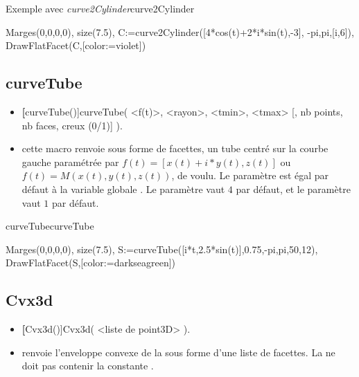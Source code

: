 \begin{demo}{Exemple avec \textsl{curve2Cylinder}}{curve2Cylinder}
\begin{texgraph}[name=curve2Cylinder]
Marges(0,0,0,0), size(7.5),
C:=curve2Cylinder([4*cos(t)+2*i*sin(t),-3],
         -pi,pi,[i,6]),
DrawFlatFacet(C,[color:=violet]) 
\end{texgraph}
\end{demo}


\subsection{curveTube}
\begin{itemize}
 \item \util \textbf[curveTube()]{curveTube( <f(t)>, <rayon>, <tmin>, <tmax> [, nb points, nb faces, creux (0/1)] )}.
 \item \desc cette macro renvoie sous forme de facettes, un tube centré sur la courbe gauche paramétrée par $f(t)=[x(t)+i*y(t), z(t)]$ ou $f(t)=M(x(t),y(t),z(t))$, de  voulu. Le paramètre  est égal par défaut à la variable globale . Le paramètre  vaut $4$ par défaut, et le paramètre  vaut $1$ par défaut.
\end{itemize}


\begin{demo}{curveTube}{curveTube}
\begin{texgraph}[name=curveTube]
Marges(0,0,0,0), size(7.5),
S:=curveTube([i*t,2.5*sin(t)],0.75,-pi,pi,50,12),
DrawFlatFacet(S,[color:=darkseagreen])
\end{texgraph}
\end{demo}

\subsection{Cvx3d}
\begin{itemize}
 \item \util \textbf[Cvx3d()]{Cvx3d( <liste de point3D> )}.
 \item \desc renvoie l'enveloppe convexe de la  sous forme d'une liste de facettes. La  ne doit pas contenir la constante \jump.
\end{itemize}



